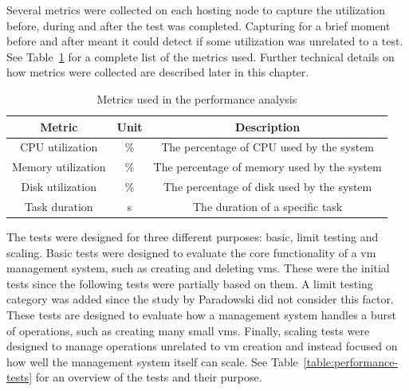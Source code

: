 \documentclass{kththesis}
\begin{document}
Several metrics were collected on each hosting node to capture the utilization before, during and after the test was completed. Capturing for a brief moment before and after meant it could detect if some utilization was unrelated to a test. See Table\ \ref{table:performance-metrics} for a complete list of the metrics used. Further technical details on how metrics were collected are described later in this chapter.

\begin{table}
    \caption{Metrics used in the performance analysis}
    \centering
    \begin{tabular}{ |c c c| }
        \hline
        \textbf{Metric} & \textbf{Unit} & \textbf{Description}\\
        \hline
        \hline
        CPU utilization & \% & The percentage of CPU used by the system\\
        \hline
        Memory utilization & \% & The percentage of memory used by the system\\
        \hline
        Disk utilization & \% & The percentage of disk used by the system\\
        \hline
        Task duration & s & The duration of a specific task\\
        \hline
    \end{tabular}
    \label{table:performance-metrics}
\end{table}

The tests were designed for three different purposes: basic, limit testing and scaling. Basic tests were designed to evaluate the core functionality of a \Gls{vm} management system, such as creating and deleting \Glspl{vm}. These were the initial tests since the following tests were partially based on them. A limit testing category was added since the study by Paradowski did not consider this factor. These tests are designed to evaluate how a management system handles a burst of operations, such as creating many small \Glspl{vm}. Finally, scaling tests were designed to manage operations unrelated to \Gls{vm} creation and instead focused on how well the management system itself can scale. See Table\ \ref{table:performance-tests} for an overview of the tests and their purpose.
\end{document}
